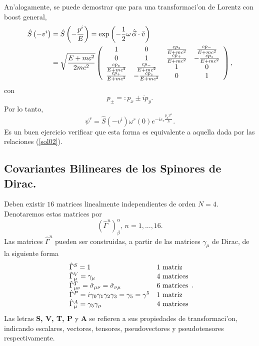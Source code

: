 An'alogamente, se puede demostrar que para una transformaci'on de Lorentz con
boost general,
\begin{align}
\hat{S}\left( -v^i\right)  & =\hat{S}\left( -\frac{p^i}{E}\right)
=\exp\left( -\frac{1}{2}\omega\,\hat{\vec{\alpha}}\cdot\check{v}\right) \\
& =\sqrt{\frac{E+mc^2}{2mc^2}}\left(
\begin{array}
[c]{cccc}%
1 & 0 & \frac{cp_{z}}{E+mc^2} & \frac{cp_{-}}{E+mc^2}\\
0 & 1 & \frac{cp_{+}}{E+mc^2} & -\frac{cp_{z}}{E+mc^2}\\
\frac{cp_{z}}{E+mc^2} & \frac{cp_{-}}{E+mc^2} & 1 & 0\\
\frac{cp_{+}}{E+mc^2} & -\frac{cp_{z}}{E+mc^2} & 0 & 1
\end{array}
\right),
\end{align}
con
\begin{equation}
p_{\pm}=:p_{x}\pm ip_{y}.
\end{equation}
Por lo tanto,
\begin{equation}
\psi^{r}=\hat{S}\left( -v^i\right) \omega^{r}(0)
e^{-i\varepsilon_{r}\frac{p_\mu x^\mu}{\hbar}}.
\end{equation}
Es un buen ejercicio verificar que esta forma es equivalente a aquella dada por
las relaciones (\ref{sol02}).

\subsection{Covariantes Bilineares de los Spinores de Dirac.}

Deben existir $16$ matrices linealmente independientes de orden $N=4$.
Denotaremos estas matrices por
\begin{equation}
\left( \hat{\Gamma}^{n}\right) _{\beta}^{\alpha}\text{, }n=1,...,16.
\end{equation}
Las matrices $\hat{\Gamma}^{n}$ pueden ser construidas, a partir de las matrices
$\gamma_\mu$ de Dirac, de la siguiente forma
\begin{equation}
\begin{array}
[c]{ll}%
\hat{\Gamma}^{S}=1 & 1\text{ matriz}\\
\hat{\Gamma}_\mu^{V}=\gamma_\mu  & 4\text{ matrices}\\
\hat{\Gamma}_{\mu\nu}^{T}=\hat{\sigma}_{\mu\nu}=\hat{\sigma}_{\nu\mu} &
6\text{ matrices}\\
\hat{\Gamma}^{P}=i\gamma_0\gamma_{1}\gamma_{2}\gamma_{3}=\gamma_{5}
=\gamma^{5} & 1\text{ matriz}\\
\hat{\Gamma}_\mu^{A}=\gamma_{5}\gamma_\mu  & 4\text{ matrices}
\end{array}.
\end{equation}
Las letras \textbf{S, V, T, P} y \textbf{A} se refieren a sus propiedades de
transformaci'on, indicando escalares, vectores, tensores, pseudovectores y
pseudotensores respectivamente.

